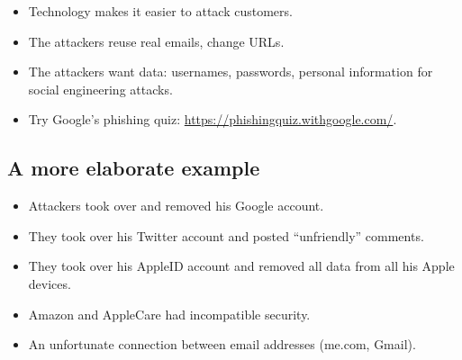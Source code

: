 \begin{frame}
  \begin{summary}
    \begin{itemize}
      \item Technology makes it easier to attack customers.
      \item The attackers reuse real emails, change URLs.
      \item The attackers want data: usernames, passwords, personal information 
        for social engineering attacks.
    \end{itemize}
  \end{summary}

  \begin{remark}
    \begin{itemize}
      \item Try Google's phishing quiz: 
        \url{https://phishingquiz.withgoogle.com/}.
    \end{itemize}
  \end{remark}
\end{frame}

\subsection{A more elaborate example}

\begin{frame}
  \begin{example}
    \begin{itemize}
      \item Attackers took over and removed his Google account.
      \item They took over his Twitter account and posted \enquote{unfriendly} 
        comments.
      \item They took over his AppleID account and removed all data from all 
        his Apple devices.
    \end{itemize}
  \end{example}
\end{frame}

\begin{frame}
  \begin{example}
    \begin{itemize}
      \item Amazon and AppleCare had incompatible security.
      \item An unfortunate connection between email addresses (me.com, Gmail).
    \end{itemize}
  \end{example}
\end{frame}



\begin{frame}[allowframebreaks]
	\small
  \printbibliography
\end{frame}

